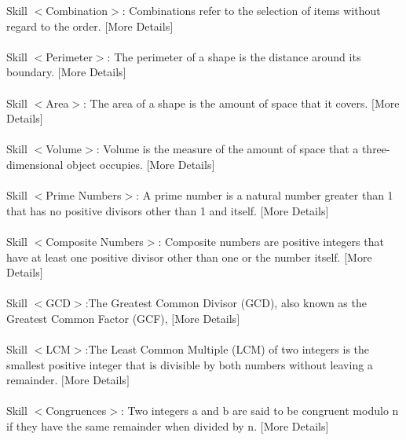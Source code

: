 \documentclass{article} %
\begin{document}
\begin{tcolorbox}[title = {Skills for MATH}, colback = Apricot!25!white, colframe = BrickRed!75!black,fontupper =\fontsize{7.5pt}{6pt}\selectfont]
Skill $<$Combination$>$:  Combinations refer to the selection of items without regard to the order. $[$More Details$]$\\ \\

Skill $<$Perimeter$>$:  The perimeter of a shape is the distance around its boundary. $[$More Details$]$\\ \\

Skill $<$Area$>$:  The area of a shape is the amount of space that it covers. $[$More Details$]$\\ \\

Skill $<$Volume$>$:   Volume is the measure of the amount of space that a three-dimensional object occupies. $[$More Details$]$\\ \\

Skill $<$Prime Numbers$>$: A prime number is a natural number greater than 1 that has no positive divisors other than 1 and itself. $[$More Details$]$\\ \\

Skill $<$Composite Numbers$>$: Composite numbers are positive integers that have at least one positive divisor other than one or the number itself. $[$More Details$]$\\ \\

Skill $<$GCD$>$:The Greatest Common Divisor (GCD), also known as the Greatest Common Factor (GCF),  $[$More Details$]$\\ \\

Skill $<$LCM$>$:The Least Common Multiple (LCM) of two integers is the smallest positive integer that is divisible by both numbers without leaving a remainder. $[$More Details$]$\\ \\

Skill $<$Congruences$>$: Two integers a and b are said to be congruent modulo n if they have the same remainder when divided by n. $[$More Details$]$ \\
\end{tcolorbox}
\noindent\begin{minipage}{\textwidth} 
 \label{Tab:math_skill}
\end{minipage}


\newpage
\end{document}
